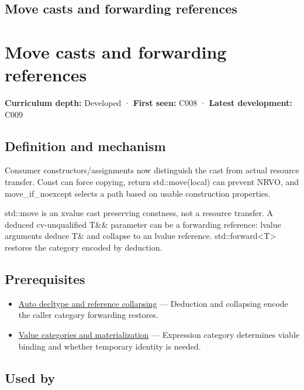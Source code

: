 \hypertarget{appendix-0104b704fb11}{}
\section*{Move casts and forwarding references}
\chapter{Move casts and forwarding references}\label{appendix-0104b704fb11-move-casts-and-forwarding-references}

\textbf{Curriculum depth:} Developed · \textbf{First seen:} C008 · \textbf{Latest development:} C009

\section{Definition and mechanism}\label{appendix-0104b704fb11-definition-and-mechanism}

Consumer constructors/assignments now distinguish the cast from actual resource transfer. Const can force copying, return std::move(local) can prevent NRVO, and move\_if\_noexcept selects a path based on usable construction properties.

std::move is an xvalue cast preserving constness, not a resource transfer. A deduced cv-unqualified T\&\& parameter can be a forwarding reference: lvalue arguments deduce T\& and collapse to an lvalue reference. std::forward\textless T\textgreater{} restores the category encoded by deduction.

\section{Prerequisites}\label{appendix-0104b704fb11-prerequisites}

\begin{itemize}
\tightlist
\item
  \hyperref[appendix-5d4252a42886]{Auto decltype and reference collapsing} --- Deduction and collapsing encode the caller category forwarding restores.
\item
  \hyperref[appendix-1121b30eaeb0]{Value categories and materialization} --- Expression category determines viable binding and whether temporary identity is needed.
\end{itemize}

\section{Used by}\label{appendix-0104b704fb11-used-by}

